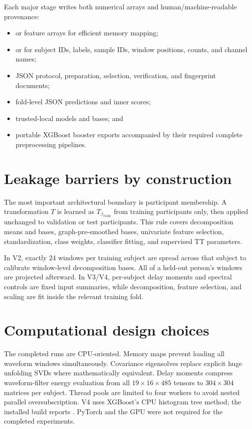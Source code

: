Each major stage writes both numerical arrays and human/machine-readable
provenance:

\begin{itemize}
  \item {} or feature arrays for efficient memory mapping;
  \item {} or  for subject IDs, labels, sample
  IDs, window positions, counts, and channel names;
  \item JSON protocol, preparation, selection, verification, and fingerprint
  documents;
  \item fold-level JSON predictions and inner scores;
  \item trusted-local  models and bases; and
  \item portable XGBoost booster exports accompanied by their required complete
  preprocessing pipelines.
\end{itemize}

\section{Leakage barriers by construction}

The most important architectural boundary is participant membership. A
transformation $T$ is learned as $T_{\mathcal{I}_{\mathrm{train}}}$ from training
participants only, then applied unchanged to validation or test participants.
This rule covers decomposition means and bases, graph-pre-smoothed bases,
univariate feature selection, standardization, class weights, classifier fitting,
and supervised TT parameters.

In V2, exactly 24 windows per training subject are spread across that subject to
calibrate window-level decomposition bases. All of a held-out person's windows
are projected afterward. In V3/V4, per-subject delay moments and spectral
controls are fixed input summaries, while decomposition, feature selection, and
scaling are fit inside the relevant training fold.

\section{Computational design choices}

The completed runs are CPU-oriented. Memory maps prevent loading all waveform
windows simultaneously. Covariance eigensolves replace explicit huge unfolding
SVDs where mathematically equivalent. Delay moments compress waveform-filter
energy evaluation from all $19\times16\times485$ tensors to $304\times304$
matrices per subject. Thread pools are limited to four workers to avoid nested
parallel oversubscription. V4 uses XGBoost's CPU histogram tree method; the
installed build reports . PyTorch and the GPU were not
required for the completed experiments.
